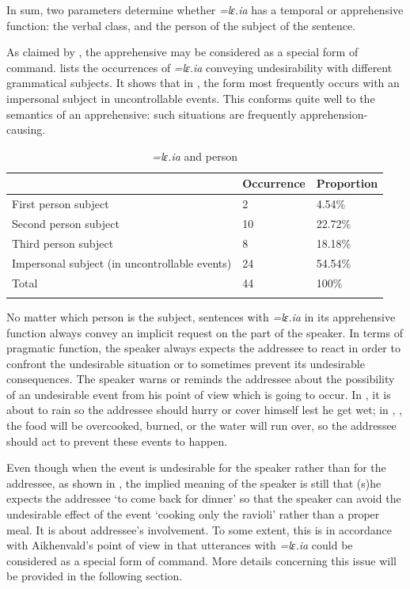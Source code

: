 \documentclass[output=paper,colorlinks,citecolor=brown, language=chinese]{langscibook}
\begin{document}
In sum, two parameters determine whether \textit{=lɛ.ia} has a temporal or apprehensive function: the verbal class, and the person of the subject of the sentence.


As claimed by \citet[225--226]{Aikhenvald2010}, the apprehensive may be considered as a special form of command.  lists the occurrences of \textit{=lɛ.ia} conveying undesirability  with different grammatical subjects. It shows that in , the form most frequently occurs with an  impersonal subject in uncontrollable events. This conforms quite well to the semantics of an apprehensive: such situations are frequently apprehension-causing.


\begin{table}
\begin{tabularx}{\textwidth}{l YY}
\lsptoprule
 & Occurrence & Proportion \\
\midrule
First person subject                      & 2  & 4.54\%   \\
Second person subject                     & 10 & 22.72\%  \\
Third person subject                      & 8  & 18.18\%  \\
Impersonal subject (in uncontrollable events) & 24 & 54.54\%  \\
\midrule
Total                                     & 44 & 100\%    \\
\lspbottomrule
\end{tabularx}
\caption{\textit{=lɛ.ia} and person}
\label{tab:song:4}
\end{table}


No matter which person is the subject, sentences with \textit{=lɛ.ia} in its apprehensive function always convey an implicit request on the part of the speaker. In terms of pragmatic function, the speaker always expects the addressee to react in order to confront the undesirable situation or to sometimes prevent its undesirable consequences. The speaker warns or reminds the addressee about the possibility of an undesirable event from his point of view which is going to occur. In , it is about to rain so the addressee should hurry or cover himself lest he get wet; in , ,  the food will be overcooked, burned, or the water will run over, so the addressee should act to prevent these events to happen.

Even though when the event is undesirable for the speaker rather than for the addressee, as shown in , the implied meaning of the speaker is still that (s)he expects the addressee `to come back for dinner' so that the speaker can avoid the undesirable effect of the event `cooking only the ravioli' rather than a proper meal. It is about addressee's involvement. To some extent, this is in accordance with Aikhenvald's point of view in that utterances with \textit{=lɛ.ia} could be considered as a special form of command. More details concerning this issue will be provided in the following section.
\end{document}
